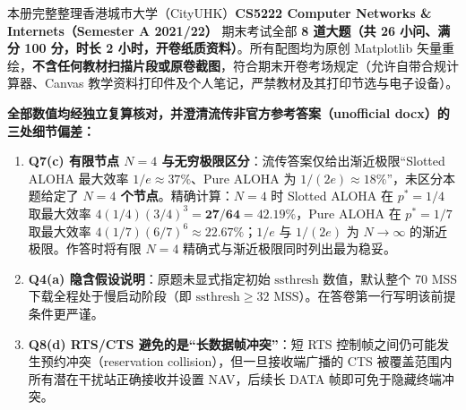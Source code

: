 \newcommand{\StudyBook}{CS5222-Final}
\newcommand{\StudyRoot}{../../..}

\renewcommand{\StudySourceRef}{CS5222-Final-2021A}
\renewcommand{\StudyDate}{2026-11-26}


\tableofcontents


本册完整整理香港城市大学（CityUHK）\textbf{CS5222 Computer Networks \& Internets（Semester A 2021/22）} 期末考试全部 \textbf{8 道大题（共 26 小问、满分 100 分，时长 2 小时，开卷纸质资料）}。所有配图均为原创 Matplotlib 矢量重绘，\textbf{不含任何教材扫描片段或原卷截图}，符合期末开卷考场规定（允许自带合规计算器、Canvas 教学资料打印件及个人笔记，严禁教材及其打印节选与电子设备）。

\textbf{全部数值均经独立复算核对，并澄清流传非官方参考答案（unofficial docx）的三处细节偏差：}
\begin{enumerate}
\item \textbf{Q7(c) 有限节点 $N=4$ 与无穷极限区分}：流传答案仅给出渐近极限“Slotted ALOHA 最大效率 $1/e\approx 37\%$、Pure ALOHA 为 $1/(2e)\approx 18\%$”，未区分本题给定了 \textbf{$N=4$ 个节点}。精确计算：$N=4$ 时 Slotted ALOHA 在 $p^*=1/4$ 取最大效率 $4(1/4)(3/4)^3 = \mathbf{27/64 = 42.19\%}$，Pure ALOHA 在 $p^*=1/7$ 取最大效率 $4(1/7)(6/7)^6 \approx \mathbf{22.67\%}$；$1/e$ 与 $1/(2e)$ 为 $N\to\infty$ 的渐近极限。作答时将有限 $N=4$ 精确式与渐近极限同时列出最为稳妥。
\item \textbf{Q4(a) 隐含假设说明}：原题未显式指定初始 $\mathrm{ssthresh}$ 数值，默认整个 70 MSS 下载全程处于慢启动阶段（即 $\mathrm{ssthresh}\ge 32\text{ MSS}$）。在答卷第一行写明该前提条件更严谨。
\item \textbf{Q8(d) RTS/CTS 避免的是“长数据帧冲突”}：短 RTS 控制帧之间仍可能发生预约冲突（reservation collision），但一旦接收端广播的 CTS 被覆盖范围内所有潜在干扰站正确接收并设置 NAV，后续长 DATA 帧即可免于隐藏终端冲突。
\end{enumerate}

